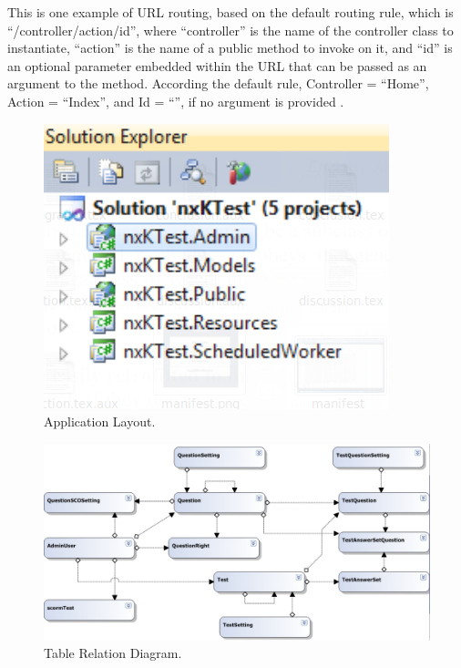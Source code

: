 This is one example of URL routing, based on the default routing rule, which is ``/{controller}/{action}/{id}'', where ``controller'' is the name of 
the controller class to instantiate, ``action'' is the name of a public method to invoke on it, and ``id'' is an optional parameter embedded within 
the URL that can be passed as an argument to the method. According the default rule, Controller = ``Home'', Action = ``Index'', and Id = ``'', if no 
argument is provided \cite{mvc_routing}.
\begin{figure}[h]
	\begin{center}
		\includegraphics[scale=0.4]{application_layout.png}
	\end{center}
	\caption{Application Layout.}
	\label{fig:app_layout}
\end{figure}
\begin{figure}[t]
	\begin{center}
		\includegraphics[scale=0.3]{database_layout.png}
	\end{center}
	\label{fig:database_layout}
	\caption{Table Relation Diagram.}
\end{figure}
